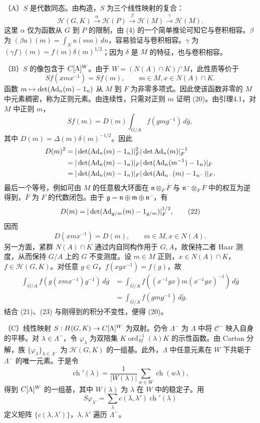 （A）$S$ 是代数同态。由构造，$S$ 为三个线性映射的复合：
\[
\mathcal H(G,K)\xrightarrow\alpha\mathcal H(P)\xrightarrow\beta\mathcal H(M)\xrightarrow\gamma\mathcal H(M).
\]
这里 $\alpha$ 仅为函数从 $G$ 到 $P$ 的限制，由 (4) 的一个简单推论可知它与卷积相容。$\beta$ 为 $(\beta u)(m)=\int_Nu(mn)\,dn$，容易验证与卷积相容。$\gamma$ 为 $(\gamma f)(m)=f(m)\delta(m)^{1/2}$；因为 $\delta$ 是 $M$ 的特征，也与卷积相容。

（B）$S$ 的像包含于 $C[\Lambda]^W$。由于 $W=(N(A)\cap K)/{}^\circ M$，此性质等价于
\[
Sf(xmx^{-1})=Sf(m),\qquad m\in M,x\in N(A)\cap K.\tag{20}
\]
函数 $m\mapsto\det(\operatorname{Ad}_{n}(m)-1_{n})$ 从 $M$ 到 $F$ 为非零多项式。因此使该函数非零的 $M$ 中元素稠密，称为正则元素。由连续性，只需对正则 $m$ 证明 (20)。由引理4.1，对 $M$ 中正则 $m$，
\[
Sf(m)=D(m)\int_{G/A}f(gmg^{-1})\,d\bar g,\tag{21}
\]
其中 $D(m)=\Delta(m)\delta(m)^{-1/2}$。因此
\[
\begin{aligned}
D(m)^2&=|\det(\operatorname{Ad}_{n}(m)-1_{n})|_F^2|\det\operatorname{Ad}_{n}(m)|_F^{-1}\\
&=|\det(\operatorname{Ad}_{n}(m)-1_{n})|_F|\det(\operatorname{Ad}_{n}(m^{-1})-1_{n})|_F\\
&=|\det(\operatorname{Ad}_{n}(m)-1_{n})|_F|\det(\operatorname{Ad}_{n^-}(m)-1_{n^-})|_F.
\end{aligned}
\]
最后一个等号，例如可由 $M$ 的任意极大环面在 $\mathfrak n\otimes_F\overline F$ 与 $\mathfrak n^-\otimes_F\overline F$ 中的权互为逆得到，$\overline F$ 为 $F$ 的代数闭包。由于 $\mathfrak g=\mathfrak n\oplus\mathfrak m\oplus\mathfrak n^-$，有
\[
D(m)=|\det(\operatorname{Ad}_{g/m}(m)-1_{g/m})|_F^{1/2},\tag{22}
\]
因而
\[
D(xmx^{-1})=D(m),\qquad m\in M,x\in N(A).\tag{23}
\]
另一方面，紧群 $N(A)\cap K$ 通过内自同构作用于 $G,A$，故保持二者 Haar 测度，从而保持 $G/A$ 上的 $G$ 不变测度。设 $m\in M$ 正则，$x\in N(A)\cap K$，$f\in\mathcal H(G,K)$。对任意 $g\in G$，$f(xgx^{-1})=f(g)$，故
\[
\begin{aligned}
\int_{G/A}f(g(xmx^{-1})g^{-1})\,d\bar g
&=\int_{G/A}f((x^{-1}gx)m(x^{-1}gx)^{-1})\,d\bar g\\
&=\int_{G/A}f(gmg^{-1})\,d\bar g.
\end{aligned}
\]
结合 (21)、(23) 与刚得到的积分不变性，便得 (20)。

（C）线性映射 $S:H(G,K)\to C[\Lambda]^W$ 为双射。仍令 $\Lambda^-$ 为 $\Lambda$ 中将 $\mathcal C^-$ 映入自身的平移。对 $\lambda\in\Lambda^-$，令 $\varphi_\lambda$ 为双陪集 $K\operatorname{ord}_M^{-1}(\lambda)K$ 的示性函数。由 Cartan 分解，族 $\{\varphi_\lambda\}_{\lambda\in\Lambda^-}$ 为 $\mathcal H(G,K)$ 的一组基。此外，$\Lambda$ 中任意元素在 $W$ 下共轭于 $\Lambda^-$ 的唯一元素。于是令
\[
\operatorname{ch}'(\lambda)=\frac1{|W(\lambda)|}\sum_{w\in W}\operatorname{ch}(w\lambda),\tag{24}
\]
得到 $C[\Lambda]^W$ 的一组基，其中 $W(\lambda)$ 为 $\lambda$ 在 $W$ 中的稳定子。用
\[
S\varphi_{\lambda'}=\sum_\lambda c(\lambda,\lambda')\operatorname{ch}'(\lambda)\tag{25}
\]
定义矩阵 $\{c(\lambda,\lambda')\}$，$\lambda,\lambda'$ 遍历 $\Lambda^-$。

